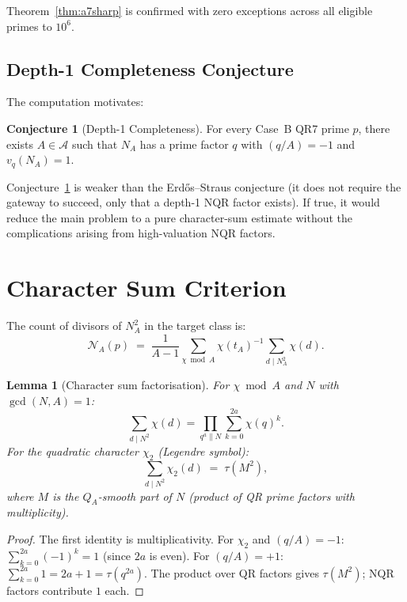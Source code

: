 \documentclass[12pt]{amsart}
\newtheorem{lemma}[theorem]{Lemma}
\theoremstyle{definition}
\newtheorem{conjecture}[theorem]{Conjecture}
\theoremstyle{remark}
\begin{document}
Theorem~\ref{thm:a7sharp} is confirmed with zero exceptions
across all eligible primes to $10^6$.

\subsection{Depth-1 Completeness Conjecture}

The computation motivates:

\begin{conjecture}[Depth-1 Completeness]\label{conj:depth1}
For every Case~B QR7 prime $p$, there exists $A \in \mathcal{A}$
such that $N_A$ has a prime factor $q$ with
$(q/A) = -1$ and $v_q(N_A) = 1$.
\end{conjecture}

Conjecture~\ref{conj:depth1} is weaker than the Erd\H{o}s--Straus conjecture
(it does not require the gateway to succeed, only that a depth-1 NQR factor exists).
If true, it would reduce the main problem to a pure character-sum estimate
without the complications arising from high-valuation NQR factors.

\section{Character Sum Criterion}\label{sec:charsum}

The count of divisors of $N_A^2$ in the target class is:
\begin{equation}\label{eq:count}
  \mathcal{N}_A(p) \;=\; \frac{1}{A-1}\sum_{\chi \bmod A}\chi(t_A)^{-1}
  \sum_{d \mid N_A^2}\chi(d).
\end{equation}

\begin{lemma}[Character sum factorisation]\label{lem:char-factor}
For $\chi \bmod A$ and $N$ with $\gcd(N,A)=1$:
\[
  \sum_{d \mid N^2}\chi(d)
  = \prod_{q^a \| N}\sum_{k=0}^{2a}\chi(q)^k.
\]
For the quadratic character $\chi_2$ (Legendre symbol):
\[
  \sum_{d \mid N^2}\chi_2(d) \;=\; \tau(M^2),
\]
where $M$ is the $Q_A$-smooth part of $N$ (product of QR prime factors with multiplicity).
\end{lemma}

\begin{proof}
The first identity is multiplicativity.
For $\chi_2$ and $(q/A) = -1$: $\sum_{k=0}^{2a}(-1)^k = 1$ (since $2a$ is even).
For $(q/A) = +1$: $\sum_{k=0}^{2a} 1 = 2a+1 = \tau(q^{2a})$.
The product over QR factors gives $\tau(M^2)$; NQR factors contribute $1$ each.
\end{proof}
\end{document}
